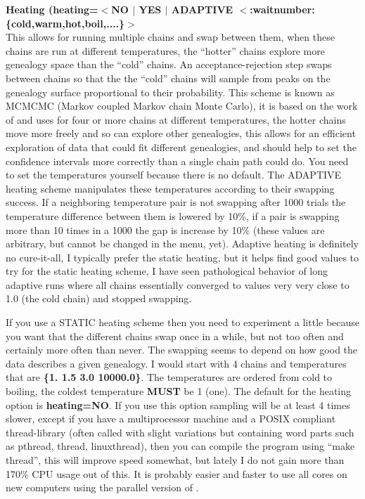 \begin{description}
\item{\bf Heating  (heating=$<$NO $|$ YES $|$ ADAPTIVE $<$:waitnumber:\{cold,warm,hot,boil,....\}$>$}\\
This allows for running multiple chains and swap between them, when 
these chains are run at different temperatures, 
the ``hotter'' chains explore more genealogy space than the 
``cold'' chains. An acceptance-rejection
step swaps between chains so that the the ``cold'' chains will sample
from peaks on the genealogy surface proportional to their
probability. This scheme is known as MCMCMC (Markov 
coupled Markov chain Monte Carlo),
it is based on the work of \cite{geyer:1995:amc} and uses for
four or more chains at different temperatures, the hotter chains move more freely
and so can explore other genealogies, this allows for an efficient 
exploration of data that could fit different genealogies, and should help
to set the confidence intervals more correctly than a single chain path 
could do. You need to set the temperatures yourself because there is no default.
The ADAPTIVE heating scheme manipulates these temperatures according to their
swapping success. If a neighboring temperature pair is not swapping after 1000 trials
the temperature difference between them is lowered by 10\%, if a pair is swapping more than
10 times in a 1000 the gap is increase by 10\% (these values are arbitrary, but cannot be changed in the menu, yet).
Adaptive heating is definitely no cure-it-all, I typically prefer the static heating, but it helps find good values to try for the static heating scheme, I have seen pathological behavior of long adaptive runs where all chains essentially converged to values very very close to 1.0 (the cold chain) and stopped swapping. 

If you use a STATIC heating scheme then you need to experiment a little because you want that the different
chains swap once in a while, but not too often and certainly more often
than never. The swapping seems to depend on how good the data describes a 
given genealogy. I would start with 4 chains and 
temperatures that are {\bf \{1. 1.5 3.0 10000.0\}}. 
The temperatures are ordered 
from cold to boiling, the coldest temperature {\bf MUST} be 1 (one).
The default for the heating option is {\bf heating=NO}. If you use
this option sampling will be at least 4 times slower, except 
if you have a multiprocessor machine and a POSIX compliant thread-library
(often called with slight variations but containing word parts such 
as pthread, thread, linuxthread), 
then you can compile the program using ``make thread'',  this will improve speed somewhat, but lately I do not gain more than 170\% CPU usage out of this. It is probably easier and faster to use all cores on new computers using the parallel version of \migrate.


\end{description}
